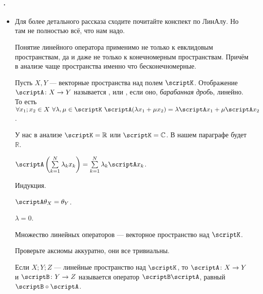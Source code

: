 \documentclass{article}
\begin{document}
    \paragraph{.}
    \begin{itemize}
        \item[]
        \begin{Comment}
            Для более детального рассказа сходите почитайте конспект по ЛинАлу. Но там не полностью всё, что нам надо.
        \end{Comment}
        \begin{Comment}
            Понятие линейного оператора применимо не только к евклидовым пространствам, да и даже не только к конечномерным пространствам. Причём в анализе чаще пространства именно что бесконечномерные.
        \end{Comment}
        \dfn Пусть $X,Y$ --- векторные пространства над полем $\scriptK$. Отображение $\scriptA\colon X\to Y$ называется ,  или , если оно, \textit{барабанная дробь}, линейно. То есть $\forall x_1;x_2\in X~\forall\lambda,\mu\in\scriptK~\scriptA(\lambda x_1+\mu x_2)=\lambda\scriptA x_1+\mu\scriptA x_2$.
        \begin{Comment}
            У нас в анализе $\scriptK=\mathbb R$ или $\scriptK=\mathbb C$. В нашем параграфе будет $\mathbb R$.
        \end{Comment}
        \thm $\scriptA\left(\sum\limits_{k=1}^N\lambda_kx_k\right)=\sum\limits_{k=1}^N\lambda_k\scriptA x_k$.
        \begin{Proof}
            Индукция.
        \end{Proof}
        \thm $\scriptA\theta_X=\theta_Y$.
        \begin{Proof}
            $\lambda=0$.
        \end{Proof}
        \thm Множество линейных операторов --- векторное пространство над $\scriptK$.
        \begin{Proof}
            Проверьте аксиомы аккуратно, они все тривиальны.
        \end{Proof}
        \dfn Если $X;Y;Z$ --- линейные пространство над $\scriptK$, то  $\scriptA\colon X\to Y$ и $\scriptB\colon Y\to Z$ называется оператор $\scriptB\scriptA$, равный $\scriptB\circ\scriptA$.
        \begin{Comment}

\end{Comment}
\end{itemize}
\end{document}
